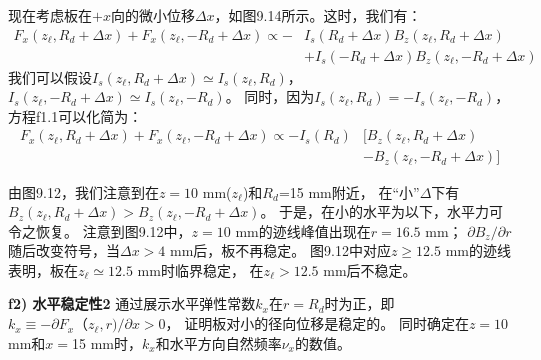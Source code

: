 现在考虑板在$+x$向的微小位移$\Delta x$，如图9.14所示。这时，我们有：
\begin{align*}%
F_{x}(z_{\ell},R_{d}+\Delta x)+F_{x}(z_{\ell},-R_{d}+\Delta x)\propto-&I_{s}(R_{d}+\Delta x)B_{z}(z_{\ell},R_{d}+\Delta x)\\
&+I_{s}(-R_{d}+\Delta x)B_{z}(z_{\ell},-R_{d}+\Delta x)\tag{f1.1}
\end{align*}
我们可以假设$I_{s}(z_{\ell},R_{d}+\Delta x)\simeq I_{s}(z_{\ell},R_{d})$，
$I_{s}(z_{\ell},-R_{d}+\Delta x)\simeq I_{s}(z_{\ell},-R_{d})$。
同时，因为$I_{s}(z_{\ell},R_{d})=-I_{s}(z_{\ell},-R_{d})$，方程f1.1可以化简为：
\begin{align*}%
F_{x}(z_{\ell},R_{d}+\Delta x)+F_{x}(z_{\ell},-R_{d}+\Delta x)\propto-I_{s}(R_{d})&[B_{z}(z_{\ell},R_{d}+\Delta x)\\
&-B_{z}(z_{\ell},-R_{d}+\Delta x)]\tag{f1.2}
\end{align*}

由图9.12，我们注意到在$z=10$ mm($z_\ell$)和$R_d$=15 mm附近，
在“小”$\Delta$下有$B_z(z_\ell,R_d+\Delta x)>B_z(z_\ell,-R_d+\Delta x)$。
于是，在小的水平为以下，水平力可令之恢复。
注意到图9.12中，$z=10$ mm的迹线峰值出现在$r=16.5$ mm；
$\partial B_z/\partial r$随后改变符号，当$\Delta x> 4$ mm后，板不再稳定。
图9.12中对应$z\ge 12.5$ mm的迹线表明，板在$z_\ell\simeq 12.5$ mm时临界稳定，
在$z_\ell> 12.5$ mm后不稳定。

\textbf{f2) 水平稳定性2}\qquad
通过展示水平弹性常数$k_x$在$r=R_d$时为正，即$k_x\equiv -\partial F_x（z_\ell,r)/\partial x>0$，
证明板对小的径向位移是稳定的。
同时确定在$z=10$ mm和$x=$15 mm时，$k_x$和水平方向自然频率$\nu_x$的数值。

